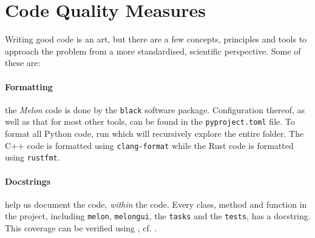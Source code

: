\section{Code Quality Measures}
Writing good code is an art, but there are a few concepts, principles and tools to approach the problem from a more standardised, scientific perspective.
Some of these are:

\paragraph{Formatting} the \textit{Melon} code is done by the \texttt{black} software package. Configuration thereof, as well as that for most other tools, can be found in the \texttt{pyproject.toml} file. To format all Python code, run  which will recursively explore the entire folder. The C++ code is formatted using \texttt{clang-format} while the Rust code is formatted using \texttt{rustfmt}.

\paragraph{Docstrings} help us document the code, \textit{within} the code. Every class, method and function in the project, including \texttt{melon}, \texttt{melongui}, the \texttt{tasks} and the \texttt{tests}, has a docstring.
This coverage can be verified using , cf. .

